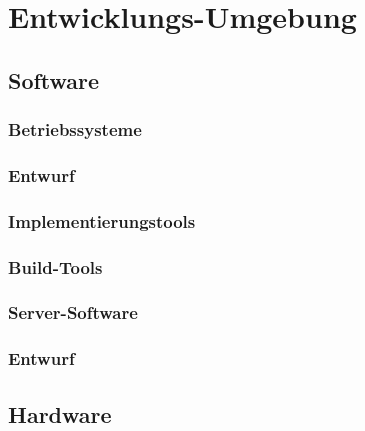 \section{Entwicklungs-Umgebung}

\subsection{Software}
	\subsubsection{Betriebssysteme}
	\subsubsection{Entwurf}
	\subsubsection{Implementierungstools}
	\subsubsection{Build-Tools}
	\subsubsection{Server-Software}
	\subsubsection{Entwurf}
	 	 
\subsection{Hardware}
